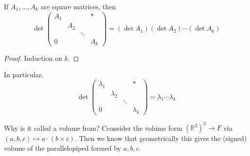\begin{corollary}
    If $A_1,\ldots,A_k$ are square matrices, then
    $$\det\begin{pmatrix}
        A_1&&&\ast\\
        &A_2&&\\
        &&\ddots&\\
        0&&&A_k
    \end{pmatrix}=(\det A_1)(\det A_2)\cdots (\det A_k)$$
\end{corollary}
\begin{proof}
    Induction on $k$.
\end{proof}
In particular,
$$\det\begin{pmatrix}
    \lambda_1&&&\ast\\
    &\lambda_2&&\\
    &&\ddots&\\
    0&&&\lambda_k
\end{pmatrix}=\lambda_1\cdots\lambda_k$$
\begin{remark}
    Why is it called a volume from?
    Cconsider the volume form $(\mathbb R^3)^3\to F$ via $(a,b,c)\mapsto a\cdot(b\times c)$.
    Then we know that geometrically this gives the (signed) volume of the parallelopiped formed by $a,b,c$.
\end{remark}